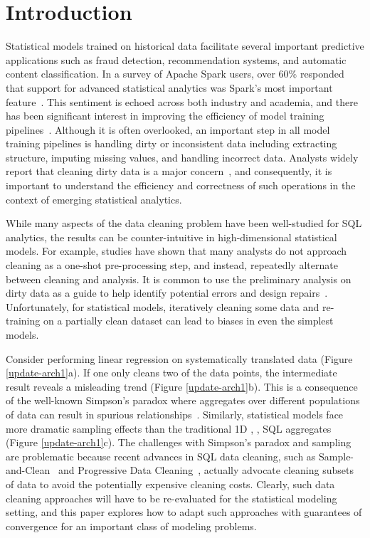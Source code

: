 \section{Introduction}\label{intro}
Statistical models trained on historical data facilitate several important predictive applications such as fraud detection, recommendation systems, and automatic content classification.
In a survey of Apache Spark users, over 60\% responded that support for advanced statistical analytics was Spark's most important feature~\cite{sparksurvey}.
This sentiment is echoed across both industry and academia, and there has been significant interest in improving the efficiency of model training pipelines~\cite{bdas, alexandrov2014stratosphere, crotty2014tupleware, tensor}. 
Although it is often overlooked, an important step in all model training pipelines is handling dirty or inconsistent data including extracting structure, imputing missing values, and handling incorrect data.
Analysts widely report that cleaning dirty data is a major concern~\cite{kandel2012,nytimes}, and consequently, it is important to understand the efficiency and correctness of such operations in the context of emerging statistical analytics.

While many aspects of the data cleaning problem have been well-studied for SQL analytics, the results can be counter-intuitive in high-dimensional statistical models.
For example, studies have shown that many analysts do not approach cleaning as a one-shot pre-processing step, and instead, repeatedly alternate between cleaning and analysis.
It is common to use the preliminary analysis on dirty data as a guide to help identify potential errors and design repairs~\cite{kandel2012}.
Unfortunately, for statistical models, iteratively cleaning some data and re-training on a partially clean dataset can lead to biases in even the simplest models.

Consider performing linear regression on systematically translated data (Figure \ref{update-arch1}a).
If one only cleans two of the data points, the intermediate result reveals a misleading trend (Figure \ref{update-arch1}b).
This is a consequence of the well-known Simpson's paradox where aggregates over different populations of data can result in spurious relationships~\cite{simpson1951interpretation}. 
Similarly, statistical models face more dramatic sampling effects than the traditional 1D  \sumfunc, \countfunc, \avgfunc SQL aggregates (Figure \ref{update-arch1}c).
The challenges with Simpson's paradox and sampling are problematic because recent advances in SQL data cleaning, such as Sample-and-Clean~\cite{wang1999sample} and Progressive Data Cleaning~\cite{altowim2014progressive, papenbrock2015progressive, DBLP:journals/pvldb/YakoutENOI11}, actually advocate cleaning subsets of data to avoid the potentially expensive cleaning costs.
Clearly, such data cleaning approaches will have to be re-evaluated for the statistical modeling setting, and this paper explores how to adapt such approaches with guarantees of convergence for an important class of modeling problems. 

